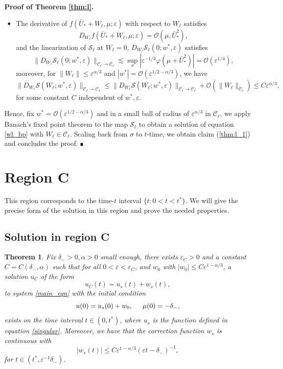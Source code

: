 \documentclass[letterpaper,11pt]{article}
\newcommand{\rmO}{\mathcal{O}}
\newcommand{\eps}{\varepsilon}
\newcommand{\lar}{ \lesssim }
\numberwithin{equation}{section}
\theoremstyle{plain}
\newtheorem{theorem}{Theorem}[section]
\newenvironment{Proof}[1][.]%
 {\begin{trivlist}\item[]\textbf{Proof#1 }}%
 {\hspace*{\fill}$\rule{0.3\baselineskip}{0.35\baselineskip}$\end{trivlist}}
\begin{document}
\begin{Proof}[ of Theorem \ref{thm:l}.]
\begin{itemize}
\item The derivative of $f(\bar{U}_*+W_\ell,\mu;\eps)$ with respect to $W_\ell$ satisfies \[
D_{W_\ell} f(\bar{U}_*+W_\ell,\mu;\eps)=\rmO(\mu, \bar{U}_*^2),
\] 
and the linearization of $\mathcal{S}_\ell$ at $W_\ell=0$, $D_{W_\ell} \mathcal{S}_\ell(0;w^*,\eps)$ satisfies
\[
\|D_{W_\ell} \mathcal{S}_{\ell}(0;w^*,\eps)\|_{\mathcal{C}_\ell\to\mathcal{C}_\ell} \lar \sup_{\sigma}|\eps^{-1/3}\varphi(\mu+\bar{U}_*^2)| = \rmO(\eps^{1/4}),
\]
moreover, for $\|W_{\ell}\|\le \eps^{\alpha/3}$ and $|w^*| =\rmO(\eps^{1/2-\alpha/3})$, we have \[
\|D_{W_\ell}\mathcal{S}(W_\ell;w^*,\eps)\|_{\mathcal{C}_\ell \to \mathcal{C}_\ell} \le  \|D_{W_\ell}\mathcal{S}(W_\ell;w^*,\eps)\|_{\mathcal{C}_\ell \to \mathcal{C}_\ell}+\rmO(\|W_\ell\|_{\mathcal{C}_\ell}) \le C\eps^{\alpha/3},
\]
for some constant $C$ independent of $w^*,\eps$.
\end{itemize}

Hence, fix $w^* = \rmO(\eps^{1/2-\alpha/3})$ and in a small ball of radius of $\eps^{\alpha/3}$ in $\mathcal{C}_\ell$, we apply Banach's fixed point theorem to the map $\mathcal{S}_\ell$ to obtain a solution of equation \eqref{wl_bp} with $W_\ell \in \mathcal{C}_\ell$. Scaling back from $\sigma$ to $t$-time, we obtain claim (\ref{thm:l_1})  and concludes the proof.
\end{Proof}


\section{Region C}\label{sec_C}
This region corresponds to the time-$t$ interval $\{t: 0<t<t^*\}$. We will give the precise form of the solution in this region and prove the needed properties.

\subsection{Solution in region C}
\begin{theorem}\label{thm:s}
Fix $\delta_->0, \alpha>0$ small enough, there exists $\eps_C>0$ and a constant $C=C(\delta_-,\alpha)$ such that for all $0<\eps <\eps_C$, and $w_0$ with $|w_0| \le  C\eps^{1-\alpha/3}$, a solution $u_C$ of the form 
\begin{equation}
u_C(t) = u_s(t) + w_s(t),
\end{equation}
to system \eqref{main_eqn} with the initial condition
\begin{equation}\label{us_ic}
u(0) = u_s(0) + w_0, \hspace{0.2in}\mu(0) =  -\delta_-,
\end{equation}
exists on the time interval $t \in (0, t^*)$, where $u_s$ is the function defined in equation \eqref{singular}. Moreover, we have that the correction function $w_s$ is continuous with
\begin{equation}\label{thm:s_1}
|w_s(t)| \le C\eps^{1-\alpha/3} (\eps t -\delta_-)^{-1},
\end{equation}
for $t \in (t^*, \eps^{-1}\delta_-)$.
\end{theorem}
\end{document}
